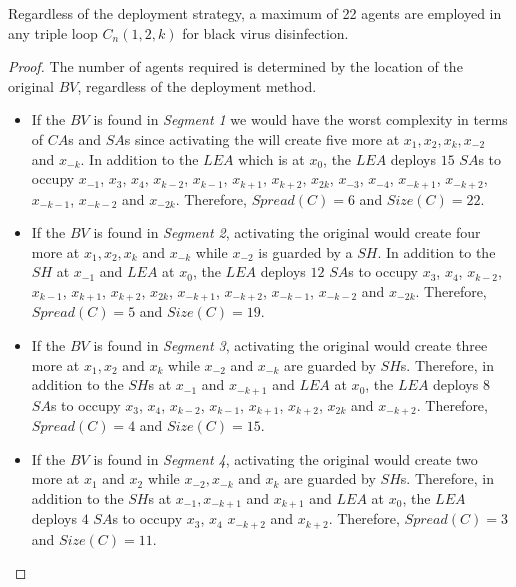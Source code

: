 \begin{theorem}


Regardless of the deployment strategy, a maximum of 22 agents are employed in any triple loop $C_n(1,2,k)$ for black virus disinfection.
\end{theorem}
\begin{proof}
The number of agents required  is determined by the location of the original $BV$, regardless of the deployment method.
\begin{itemize} 
\item If  the $BV$ is found in {\em Segment 1} we would have the worst complexity in terms of $CA$s and $SA$s since activating the \bv will create five more \bvs at $x_{1},x_{2},x_{k},x_{-2}$ and $x_{-k}$. In addition to the $LEA$ which is at $x_{0}$, the $LEA$ deploys $15$  $SA$s to occupy $x_{-1}$, $ x_{3}$,  $x_{4}$, $x_{k-2}$, $x_{k-1}$, $x_{k+1}$, $x_{k+2}$, $x_{2k}$, $x_{-3}$, $x_{-4}$, $x_{-k+1}$, $x_{-k+2}$, $x_{-k-1}$, $x_{-k-2}$ and $x_{-2k}$. Therefore, $Spread(C)=6$ and $Size(C)=22$.  
 
\item If the $BV$ is found in {\em Segment 2}, activating the original \bv would create four more \bvs at $x_{1},x_{2},x_{k}$ and $x_{-k}$ while $x_{-2}$ is guarded by a $SH$. In addition to the $SH$ at $x_{-1}$ and $LEA$ at $x_{0}$, the $LEA$ deploys $12$  $SA$s to occupy  $ x_{3}$,  $x_{4}$, $x_{k-2}$, $x_{k-1}$, $x_{k+1}$, $x_{k+2}$, $x_{2k}$, $x_{-k+1}$, $x_{-k+2}$, $x_{-k-1}$, $x_{-k-2}$ and $x_{-2k}$. Therefore, $Spread(C)=5$ and $Size(C)=19$.   

\item If the $BV$ is found in {\em Segment 3}, activating the original \bv would create three more \bvs at $x_{1},x_{2}$ and $x_{k}$ while $x_{-2}$ and $x_{-k}$ are guarded by $SH$s. Therefore, in addition to the $SH$s at $x_{-1}$ and $x_{-k+1}$ and $LEA$ at $x_{0}$, the $LEA$ deploys $8$  $SA$s to occupy  $ x_{3}$,  $x_{4}$, $x_{k-2}$, $x_{k-1}$, $x_{k+1}$, $x_{k+2}$, $x_{2k}$ and $x_{-k+2}$. Therefore, $Spread(C)=4$ and $Size(C)=15$.   
 
\item If  the $BV$ is found in {\em Segment 4}, activating the original \bv would create two more \bvs at $x_{1}$ and $x_{2}$ while $x_{-2},x_{-k}$ and $x_{k}$ are guarded by $SH$s. Therefore, in addition to the $SH$s at $x_{-1},x_{-k+1}$ and $x_{k+1}$ and $LEA$ at $x_{0}$, the $LEA$ deploys $4$  $SA$s to occupy  $x_{3}$, $x_{4}$ $x_{-k+2}$ and $x_{k+2}$.  Therefore, $Spread(C)=3$ and $Size(C)=11$.   


\end{itemize}
\end{proof}
